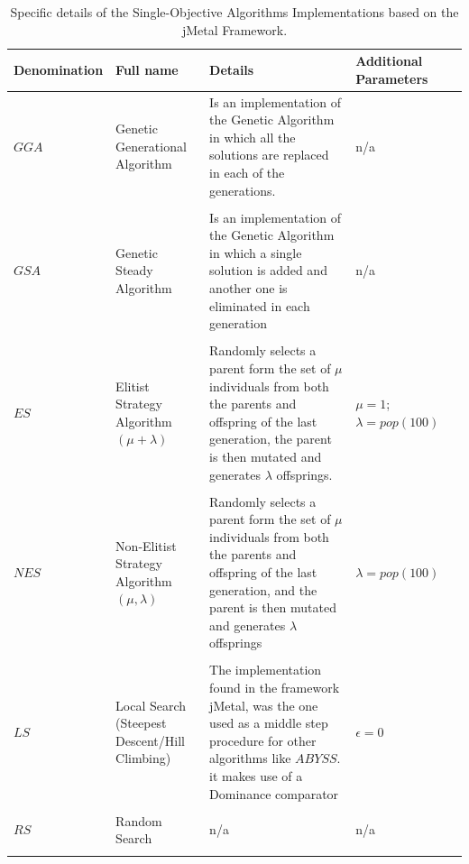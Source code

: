 \begin{table}[H]
    \begin{tabular}{p{}p{}p{}p{}p{}}
    \hline
    Denomination  & Full name & Details & Additional Parameters
    \\
    \hline
    $GGA$ & Genetic Generational Algorithm & Is an implementation of the Genetic Algorithm in which all the solutions are replaced in each of the generations. & n/a \\ \\
    $GSA$ & Genetic Steady Algorithm & Is an implementation of the Genetic Algorithm in which a single solution is added and another one is eliminated in each generation & n/a \\ \\
    $ES$ & Elitist Strategy Algorithm $(\mu + \lambda)$ & Randomly selects a parent form the set of $\mu$ individuals from both the parents and offspring of the last generation, the parent is then mutated and generates $\lambda$ offsprings. & $\mu = 1$; $\lambda = pop (100)$ \\ \\
    $NES$ & Non-Elitist Strategy Algorithm $(\mu,\lambda)$ & Randomly selects a parent form the set of $\mu$ individuals from both the parents and offspring of the last generation, and the parent is then mutated and generates $\lambda$ offsprings  & $\lambda = pop (100)$ \\ \\
    $LS$ & Local Search (Steepest Descent/Hill Climbing) & The implementation found in the framework jMetal, was the one used as a middle step procedure for other algorithms like $ABYSS$. it makes use of a Dominance comparator & $\epsilon = 0$ \\ \\
    $RS$ & Random Search & n/a & n/a  \\ \\
    \hline
    \end{tabular}
    \caption{Specific details of the Single-Objective Algorithms Implementations based on the jMetal Framework.}
    \label{table:(SOA)_details_jmetal}
\end{table}

